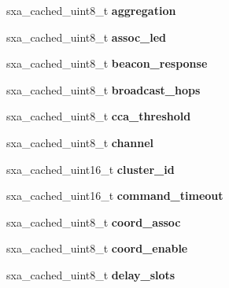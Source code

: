 \begin{DoxyCompactItemize}
\mbox{\label{structsxa__node__t_addae4971fe88bef06542be6b2de54ea3}} 
sxa\+\_\+cached\+\_\+uint8\+\_\+t {\bfseries aggregation}
\item 
\mbox{\label{structsxa__node__t_a4857814d272d7c236f20217036eadaa7}} 
sxa\+\_\+cached\+\_\+uint8\+\_\+t {\bfseries assoc\+\_\+led}
\item 
\mbox{\label{structsxa__node__t_afbbaf03169e6357fcc78463452c5f473}} 
sxa\+\_\+cached\+\_\+uint8\+\_\+t {\bfseries beacon\+\_\+response}
\item 
\mbox{\label{structsxa__node__t_a2fe0610672454f943a5a01ade84e7180}} 
sxa\+\_\+cached\+\_\+uint8\+\_\+t {\bfseries broadcast\+\_\+hops}
\item 
\mbox{\label{structsxa__node__t_a9b601d4ed7a3ec9b0e05528390e78cdd}} 
sxa\+\_\+cached\+\_\+uint8\+\_\+t {\bfseries cca\+\_\+threshold}
\item 
\mbox{\label{structsxa__node__t_a1f6b05bef57db1f1cbb4740a78914b5f}} 
sxa\+\_\+cached\+\_\+uint8\+\_\+t {\bfseries channel}
\item 
\mbox{\label{structsxa__node__t_a112bc7028dd0dd7833eff63333fae9bb}} 
sxa\+\_\+cached\+\_\+uint16\+\_\+t {\bfseries cluster\+\_\+id}
\item 
\mbox{\label{structsxa__node__t_a46cab60ad63ab8babe24c5ce86516638}} 
sxa\+\_\+cached\+\_\+uint16\+\_\+t {\bfseries command\+\_\+timeout}
\item 
\mbox{\label{structsxa__node__t_a7a94e7e4b3817846d70454a9ab66da8b}} 
sxa\+\_\+cached\+\_\+uint8\+\_\+t {\bfseries coord\+\_\+assoc}
\item 
\mbox{\label{structsxa__node__t_ad3fce2599083f4ebf5f888b8330d504a}} 
sxa\+\_\+cached\+\_\+uint8\+\_\+t {\bfseries coord\+\_\+enable}
\item 
\mbox{\label{structsxa__node__t_ab9f0e8453527234d22e536993a78456d}} 
sxa\+\_\+cached\+\_\+uint8\+\_\+t {\bfseries delay\+\_\+slots}

\end{DoxyCompactItemize}
